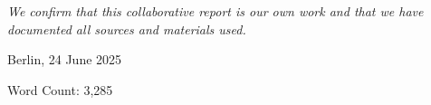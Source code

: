 \chapter*{}
\vspace{17cm}
\hfill\parbox{8cm}{
\raggedleft
	\textit{We confirm that this collaborative report is our own work and that we have documented all sources and materials used.}\par 
	\vspace{1em}
	Berlin, 24 June 2025

	\vspace{3em}
	{\footnotesize Word Count: 3,285}
}
\thispagestyle{empty}
